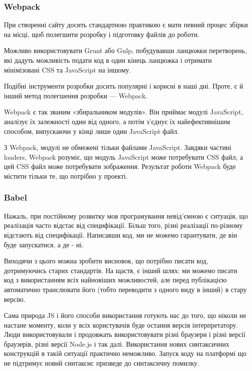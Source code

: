 

\subsubsection{Webpack}

При створенні сайту досить стандартною практикою є мати певний процес збірки на місці, щоб полегшити розробку і підготовку файлів до роботи.

Можливо використовувати Grunt або Gulp, побудувавши ланцюжки перетворень, які дадуть можливість подати код в один кінець ланцюжка і отримати мінімізовані CSS та JavaScript на іншому.

Подібні інструменти розробки досить популярні і корисні в наші дні. Проте, є й інший метод полегшення розробки — Webpack.

Webpack є так званим «збиральником модулів». Він приймає модулі JavaScript, аналізує їх залежності один від одного, а потім з'єднує їх найефективнішим способом, випускаючи у кінці лише один JavaScript файл.

З Webpack, модулі не обмежені тільки файлами JavaScript. Завдяки частині loaders, Webpack розуміє, що модуль JavaScript може потребувати CSS файл, а цей CSS файл може потребувати зображення. Результат роботи Webpack буде містити тільки те, що потрібно у проекті.

\subsubsection{Babel}

Нажаль, при постійному розвитку мов програмування невід'ємною є ситуація, що реалізація часто відстає від специфікації. Більш того, різні реалізації по-різному відстають від специфікації. Написавши код, ми не можемо гарантувати, де він буде запускатися, а де - ні.

Виходячи з цього можна зробити висновок, що потрібно писати код, дотримуючись старих стандартів. На щастя, є інший шлях: ми можемо писати код з використанням всіх найновіших можливостей, але перед публікацією автоматично транслювати його (тобто переводити з одного виду в інший) в стару версію. 

Сама природа JS і його способи використання готують нас до того, що ніколи не настане моменту, коли у всіх користувачів буде остання версія інтерпретатору. Люди використовували і продовжать використовувати різні браузери і різні версії браузерів, різні версії Node.js і так далі. Використання нових синтаксичних конструкцій в такій ситуації практично неможливо. Запуск коду на платформі що не підтримує новий синтаксис призведе до синтаксичну помилку. 

